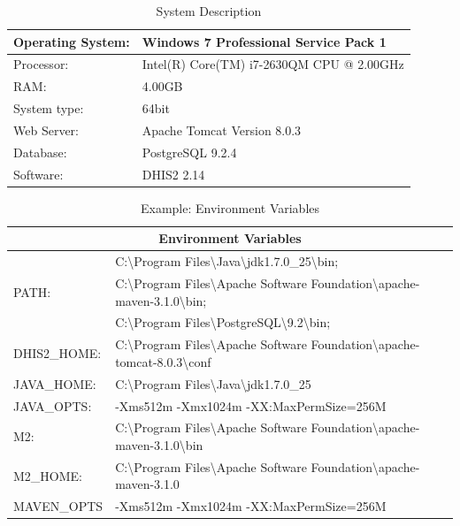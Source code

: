 \documentclass[a4paper, 11pt]{report}
\begin{document}
\begin{table}
	\centering
	\begin{tabular}{|l|l|}
		\hline
		Operating System: & Windows 7 Professional Service Pack 1 \\
		\hline
		Processor: & Intel(R) Core(TM) i7-2630QM CPU @ 2.00GHz \\
		\hline
		RAM: & 4.00GB \\
		\hline
		System type: & 64bit \\
		\hline
		Web Server: & Apache Tomcat Version 8.0.3 \\
		\hline
		Database: & PostgreSQL 9.2.4 \\
		\hline
		Software: & DHIS2 2.14 \\
		\hline
	\end{tabular}
	\caption{System Description}
\end{table}
\begin{table}
	\centering
	\begin{tabular}{|l|p{13cm}|}
		\hline
		\multicolumn{2}{|c|}{\textbf{Environment Variables}} \\
		\hline
		\multirow{3}{*}{PATH:}	& C:\textbackslash Program Files\textbackslash Java\textbackslash jdk1.7.0\_25\textbackslash bin; \\
														& C:\textbackslash Program Files\textbackslash Apache Software Foundation\textbackslash apache-maven-3.1.0\textbackslash bin; \\
														& C:\textbackslash Program Files\textbackslash PostgreSQL\textbackslash 9.2\textbackslash bin; \\
		\hline
		DHIS2\_HOME: & C:\textbackslash Program Files\textbackslash Apache Software Foundation\textbackslash apache-tomcat-8.0.3\textbackslash conf \\
		\hline
		JAVA\_HOME: & C:\textbackslash Program Files\textbackslash Java\textbackslash jdk1.7.0\_25 \\
		\hline
		JAVA\_OPTS: & -Xms512m -Xmx1024m -XX:MaxPermSize=256M \\
		\hline
		M2: 				& C:\textbackslash Program Files\textbackslash Apache Software Foundation\textbackslash apache-maven-3.1.0\textbackslash bin \\
		\hline
		M2\_HOME: 	& C:\textbackslash Program Files\textbackslash Apache Software Foundation\textbackslash apache-maven-3.1.0 \\
		\hline
		MAVEN\_OPTS	& -Xms512m -Xmx1024m -XX:MaxPermSize=256M \\
		\hline
	\end{tabular}
	\caption{Example: Environment Variables}
\end{table}
\end{document}
